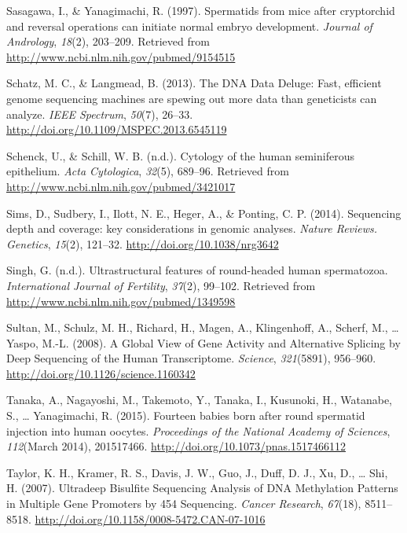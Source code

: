 \documentclass[12pt,twoside]{reedthesis}
\theoremstyle{definition}
\theoremstyle{definition}
\theoremstyle{remark}
\begin{document}
  \hypertarget{ref-Sasagawa}{}
  Sasagawa, I., \& Yanagimachi, R. (1997). Spermatids from mice after
  cryptorchid and reversal operations can initiate normal embryo
  development. \emph{Journal of Andrology}, \emph{18}(2), 203--209.
  Retrieved from \url{http://www.ncbi.nlm.nih.gov/pubmed/9154515}
  
  \hypertarget{ref-Schatz2013}{}
  Schatz, M. C., \& Langmead, B. (2013). The DNA Data Deluge: Fast,
  efficient genome sequencing machines are spewing out more data than
  geneticists can analyze. \emph{IEEE Spectrum}, \emph{50}(7), 26--33.
  \url{http://doi.org/10.1109/MSPEC.2013.6545119}
  
  \hypertarget{ref-Schenck}{}
  Schenck, U., \& Schill, W. B. (n.d.). Cytology of the human seminiferous
  epithelium. \emph{Acta Cytologica}, \emph{32}(5), 689--96. Retrieved
  from \url{http://www.ncbi.nlm.nih.gov/pubmed/3421017}
  
  \hypertarget{ref-Sims2014}{}
  Sims, D., Sudbery, I., Ilott, N. E., Heger, A., \& Ponting, C. P.
  (2014). Sequencing depth and coverage: key considerations in genomic
  analyses. \emph{Nature Reviews. Genetics}, \emph{15}(2), 121--32.
  \url{http://doi.org/10.1038/nrg3642}
  
  \hypertarget{ref-Singh}{}
  Singh, G. (n.d.). Ultrastructural features of round-headed human
  spermatozoa. \emph{International Journal of Fertility}, \emph{37}(2),
  99--102. Retrieved from \url{http://www.ncbi.nlm.nih.gov/pubmed/1349598}
  
  \hypertarget{ref-Sultan2008}{}
  Sultan, M., Schulz, M. H., Richard, H., Magen, A., Klingenhoff, A.,
  Scherf, M., \ldots{} Yaspo, M.-L. (2008). A Global View of Gene Activity
  and Alternative Splicing by Deep Sequencing of the Human Transcriptome.
  \emph{Science}, \emph{321}(5891), 956--960.
  \url{http://doi.org/10.1126/science.1160342}
  
  \hypertarget{ref-Tanaka2015}{}
  Tanaka, A., Nagayoshi, M., Takemoto, Y., Tanaka, I., Kusunoki, H.,
  Watanabe, S., \ldots{} Yanagimachi, R. (2015). Fourteen babies born
  after round spermatid injection into human oocytes. \emph{Proceedings of
  the National Academy of Sciences}, \emph{112}(March 2014), 201517466.
  \url{http://doi.org/10.1073/pnas.1517466112}
  
  \hypertarget{ref-Taylor2007}{}
  Taylor, K. H., Kramer, R. S., Davis, J. W., Guo, J., Duff, D. J., Xu,
  D., \ldots{} Shi, H. (2007). Ultradeep Bisulfite Sequencing Analysis of
  DNA Methylation Patterns in Multiple Gene Promoters by 454 Sequencing.
  \emph{Cancer Research}, \emph{67}(18), 8511--8518.
  \url{http://doi.org/10.1158/0008-5472.CAN-07-1016}
  
\end{document}
